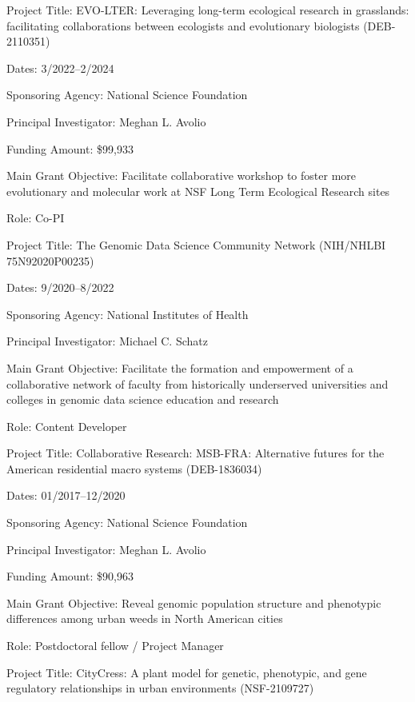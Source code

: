 \documentclass{cv}
\begin{document}
Project Title: EVO-LTER: Leveraging long-term ecological research in grasslands: facilitating collaborations between ecologists and evolutionary biologists (DEB-2110351)

Dates: 3/2022--2/2024

Sponsoring Agency: National Science Foundation

Principal Investigator: Meghan L. Avolio

Funding Amount: \$99,933

Main Grant Objective: Facilitate collaborative workshop to foster more evolutionary and molecular work at NSF Long Term Ecological Research sites

Role: Co-PI

\vspace{5mm}

Project Title: The Genomic Data Science Community Network (NIH/NHLBI 75N92020P00235)

Dates: 9/2020--8/2022

Sponsoring Agency: National Institutes of Health

Principal Investigator: Michael C. Schatz

Main Grant Objective: Facilitate the formation and empowerment of a collaborative network of faculty from historically underserved universities and colleges in genomic data science education and research

Role: Content Developer

\vspace{5mm}

Project Title: Collaborative Research: MSB-FRA: Alternative futures for the American residential macro systems (DEB-1836034)

Dates: 01/2017--12/2020

Sponsoring Agency: National Science Foundation

Principal Investigator: Meghan L. Avolio

Funding Amount: \$90,963

Main Grant Objective: Reveal genomic population structure and phenotypic differences among urban weeds in North American cities

Role: Postdoctoral fellow / Project Manager

\vspace{5mm}

Project Title: CityCress: A plant model for genetic, phenotypic, and gene regulatory relationships in urban environments (NSF-2109727)
\end{document}

